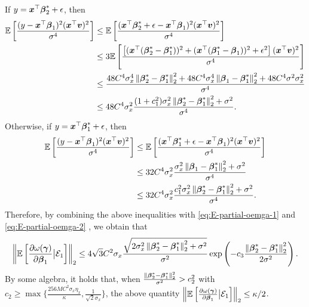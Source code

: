 If $y=\boldsymbol{x}^{\top}\boldsymbol{\beta}_2^*+\epsilon$, then 
\begin{align*}
\mathbb{E}\left[ \frac{(y-\boldsymbol{x}^{\top}\boldsymbol{\beta}_1)^2(\boldsymbol{x}^{\top}\boldsymbol{v})^2}{\sigma^4} \right] &\leq \mathbb{E}\left[ \frac{(\boldsymbol{x}^{\top}\boldsymbol{\beta}_2^*+\epsilon-\boldsymbol{x}^{\top}\boldsymbol{\beta}_1)^2(\boldsymbol{x}^{\top}\boldsymbol{v})^2}{\sigma^4} \right] \\
&\leq 3\mathbb{E}\left[ \frac{\left[ (\boldsymbol{x}^{\top}(\boldsymbol{\beta}_2^*-\boldsymbol{\beta}_1^*))^2+(\boldsymbol{x}^{\top}(\boldsymbol{\beta}_1^*-\boldsymbol{\beta}_1))^2+\epsilon^2 \right](\boldsymbol{x}^{\top}\boldsymbol{v})^2}{\sigma^4} \right]\\
& \leq \frac{48C^4\sigma_x^4\left\lVert\boldsymbol{\beta}^*_2-\boldsymbol{\beta}^*_1\right\rVert_2^2+48C^4\sigma_x^4\left\lVert\boldsymbol{\beta}_1-\boldsymbol{\beta}^*_1\right\rVert_2^2+48C^4\sigma^2\sigma_x^2}{\sigma^4} \\
&\leq 48C^4\sigma_x^2 \frac{(1+c_1^2)\sigma_x^2\left\lVert\boldsymbol{\beta}^*_2-\boldsymbol{\beta}^*_1\right\rVert_2^2+\sigma^2}{\sigma^4}.
\end{align*}
Otherwise, if $y=\boldsymbol{x}^{\top}\boldsymbol{\beta}_1^*+\epsilon$, then 
\begin{align*}
	\mathbb{E}\left[ \frac{(y-\boldsymbol{x}^{\top}\boldsymbol{\beta}_1)^2(\boldsymbol{x}^{\top}\boldsymbol{v})^2}{\sigma^4} \right] &\leq \mathbb{E}\left[ \frac{(\boldsymbol{x}^{\top}\boldsymbol{\beta}_1^*+\epsilon-\boldsymbol{x}^{\top}\boldsymbol{\beta}_1)^2(\boldsymbol{x}^{\top}\boldsymbol{v})^2}{\sigma^4} \right] \\
	& \leq 32C^4\sigma_x^2 \frac{\sigma_x^2\left\lVert\boldsymbol{\beta}_1-\boldsymbol{\beta}^*_1\right\rVert_2^2+\sigma^2}{\sigma^4}\\
	& \leq 32C^4\sigma_x^2 \frac{c_1^2\sigma_x^2\left\lVert\boldsymbol{\beta}^*_2-\boldsymbol{\beta}^*_1\right\rVert_2^2+\sigma^2}{\sigma^4}.
\end{align*}
Therefore, by combining the above inequalities with \eqref{eq:E-partial-oemga-1} and \eqref{eq:E-partial-oemga-2} , we obtain that 
\[	\left\lVert\mathbb{E}\left[\frac{\partial\omega(\boldsymbol{\gamma})}{\partial \boldsymbol{\beta}_1} \big| {\cal E}_1 \right]\right\rVert_2 \leq 4\sqrt{3}C^2\sigma_x\frac{\sqrt{2\sigma_x^2\left\lVert\boldsymbol{\beta}^*_2-\boldsymbol{\beta}^*_1\right\rVert_2^2+\sigma^2}}{\sigma^2}\exp\left( -c_3\frac{\left\lVert\boldsymbol{\beta}_2^*-\boldsymbol{\beta}^*_1\right\rVert^2_{2}}{2\sigma^2} \right).\]
By some algebra, it holds that, when $\frac{\left\lVert\boldsymbol{\beta}_2^*-\boldsymbol{\beta}^*_1\right\rVert^2_{2}}{\sigma^2} > c_2^2$ with $c_2 \geq \max\big\{\frac{256MC^2\sigma_x\eta_x}{\kappa}, \frac{1}{\sqrt{2}\sigma_x}\big\}$, the above quantity $\left\lVert\mathbb{E}\left[\frac{\partial\omega(\boldsymbol{\gamma})}{\partial \boldsymbol{\beta}_1} \big| {\cal E}_1 \right]\right\rVert_2 \leq \kappa/2$. 

